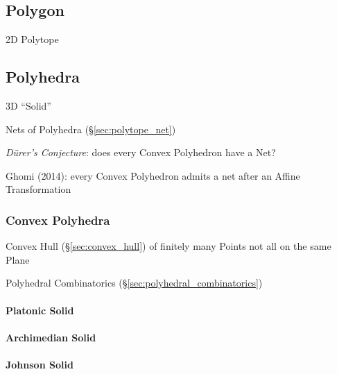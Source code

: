 \subsection{Polygon}\label{sec:polytope}

2D Polytope



\subsection{Polyhedra}\label{sec:polyhedra}

3D ``Solid''

Nets of Polyhedra (\S\ref{sec:polytope_net})

\emph{D\"urer's Conjecture}: does every Convex Polyhedron have a Net?

Ghomi (2014): every Convex Polyhedron admits a net after an Affine
Transformation



\subsubsection{Convex Polyhedra}\label{sec:convex_polyhedra}

Convex Hull (\S\ref{sec:convex_hull}) of finitely many Points not all on the
same Plane

\fist Polyhedral Combinatorics (\S\ref{sec:polyhedral_combinatorics})



\paragraph{Platonic Solid}\label{sec:platonic_solid}\hfill

\paragraph{Archimedian Solid}\label{sec:archimedian_solid}\hfill

\paragraph{Johnson Solid}\label{sec:johnson_solid}\hfill


